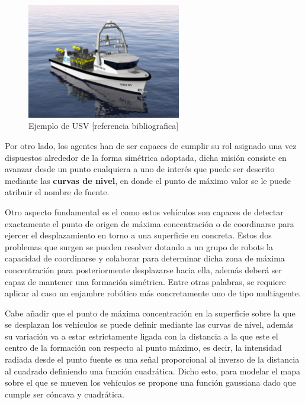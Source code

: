 \begin{figure}[htb]
\centering
\includegraphics[width=0.6\textwidth]{figures/USV.eps}
\caption{Ejemplo de USV [referencia bibliografica]} \label{fig:USV}
\end{figure}

Por otro lado, los agentes han de ser capaces de cumplir su rol asignado una vez dispuestos alrededor de la forma simétrica adoptada, dicha misión consiste en avanzar desde un punto cualquiera a uno de interés que puede ser descrito mediante las \textbf{curvas de nivel}, en donde el punto de máximo valor se le puede atribuir el nombre de fuente. 

Otro aspecto fundamental es el como estos vehículos son capaces de detectar exactamente el punto de origen de máxima concentración o de coordinarse para ejercer el desplazamiento en torno a una superficie en concreta. Estos dos problemas que surgen se pueden resolver dotando a un grupo de robots la capacidad de coordinarse y colaborar para determinar dicha zona de máxima concentración para posteriormente desplazarse hacia ella, además deberá ser capaz de mantener una formación simétrica. Entre otras palabras, se requiere aplicar al caso un enjambre robótico más concretamente uno de tipo multiagente.

Cabe añadir que el punto de máxima concentración en la superficie sobre la que se desplazan los vehículos se puede definir mediante las curvas de nivel, además su variación va a estar estrictamente ligada con la distancia a la que este el centro de la formación con respecto al punto máximo, es decir, la intensidad radiada desde el punto fuente es una señal proporcional al inverso de la distancia al cuadrado definiendo una función cuadrática. Dicho esto, para modelar el mapa sobre el que se mueven los vehículos se propone una función gaussiana dado que cumple ser cóncava y cuadrática.

